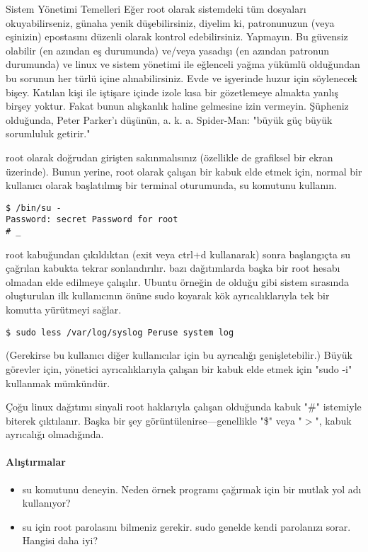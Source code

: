 \begin{section}{Sistem Yönetimi Temelleri}
Eğer root olarak sistemdeki tüm dosyaları okuyabilirseniz, günaha yenik düşebilirsiniz, diyelim ki, patronunuzun (veya eşinizin) epostasını düzenli olarak kontrol edebilirsiniz. Yapmayın. Bu güvensiz olabilir (en azından eş durumunda) ve/veya yasadışı (en azından patronun durumunda) ve linux ve sistem yönetimi ile eğlenceli yağma yükümlü olduğundan bu sorunun her türlü içine alınabilirsiniz. Evde ve işyerinde huzur için söylenecek bişey. Katılan kişi ile iştişare içinde izole kısa bir gözetlemeye almakta yanlış birşey yoktur. Fakat bunun alışkanlık haline gelmesine izin vermeyin. Şüpheniz olduğunda, Peter Parker'ı düşünün, a. k. a. Spider-Man: "büyük güç büyük sorumluluk getirir."

root olarak doğrudan girişten sakınmalısınız (özellikle de grafiksel bir ekran üzerinde). Bunun yerine, root olarak çalışan bir kabuk elde etmek için, normal bir kullanıcı olarak başlatılmış bir terminal oturumunda, su komutunu kullanın.
\begin{verbatim}
$ /bin/su -
Password: secret Password for root
# _
\end{verbatim}

root kabuğundan çıkıldıktan (exit veya ctrl+d kullanarak) sonra  başlangıçta su çağrılan kabukta tekrar sonlandırılır. bazı dağıtımlarda başka bir root hesabı olmadan elde edilmeye çalışılır. Ubuntu örneğin de olduğu gibi sistem sırasında oluşturulan ilk kullanıcının önüne sudo koyarak kök ayrıcalıklarıyla tek bir komutta yürütmeyi sağlar.
\begin{verbatim}
$ sudo less /var/log/syslog Peruse system log
\end{verbatim}

(Gerekirse bu kullanıcı diğer kullanıcılar için bu ayrıcalığı genişletebilir.) Büyük görevler için, yönetici ayrıcalıklarıyla çalışan bir kabuk elde etmek için "sudo -i" kullanmak mümkündür. 

Çoğu linux dağıtımı sinyali root haklarıyla çalışan olduğunda kabuk "\#" istemiyle biterek çıktılanır. Başka bir şey görüntülenirse—genellikle "\$" veya "$>$", kabuk ayrıcalığı olmadığında.

\paragraph{Alıştırmalar}{
\begin{itemize}
 \item su komutunu deneyin. Neden örnek programı çağırmak için bir mutlak yol adı kullanıyor?
 \item su için root parolasını bilmeniz gerekir. sudo genelde kendi parolanızı sorar. Hangisi daha iyi?
\end{itemize}}
\end{section}
